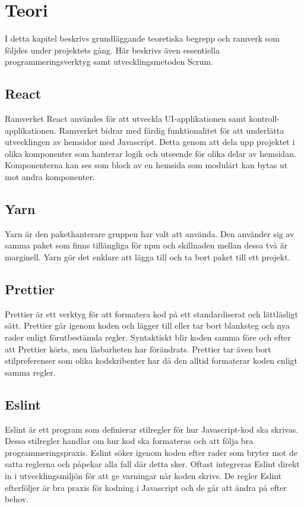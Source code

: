 \chapter{Teori}
\label{cha:theory}
I detta kapitel beskrivs grundläggande teoretiska begrepp och ramverk som följdes under projektets gång. Här beskrivs även essentiella programmeringsverktyg samt utvecklingsmetoden Scrum.

\section{React}
Ramverket React användes för att utveckla UI-applikationen samt kontroll-applikationen. Ramverket bidrar med färdig funktionalitet för att underlätta utvecklingen av hemsidor med Javascript. Detta genom att dela upp projektet i olika komponenter som hanterar logik och utseende för olika delar av hemsidan. Komponenterna kan ses som block av en hemsida som modulärt kan bytas ut mot andra komponenter.~\cite{React}

\section{Yarn}
Yarn är den pakethanterare gruppen har valt att använda. Den använder sig av samma paket som finns tillängliga för npm och skillnaden mellan dessa två är marginell. Yarn gör det enklare att lägga till och ta bort paket till ett projekt.~\cite{Yarn}

\section{Prettier}
Prettier är ett verktyg för att formatera kod på ett standardiserat och lättläsligt sätt. Prettier går igenom koden och lägger till eller tar bort blanksteg och nya rader enligt förutbestämda regler. Syntaktiskt blir koden samma före och efter att Prettier körts, men läsbarheten har förändrats. Prettier tar även bort stilpreferenser som olika kodskribenter har då den alltid formaterar koden enligt samma regler.~\cite{prettier}


\section{Eslint}
Eslint är ett program som definierar stilregler för hur Javascript-kod ska skrivas. Dessa stilregler handlar om hur kod ska formateras och att följa bra programmeringspraxis. Eslint söker igenom koden efter rader som bryter mot de satta reglerna och påpekar alla fall där detta sker. Oftast integreras Eslint direkt in i utvecklingsmiljön för att ge varningar när koden skrivs. De regler Eslint efterföljer är bra praxis för kodning i Javascript och de går att ändra på efter behov.~\cite{eslint}


